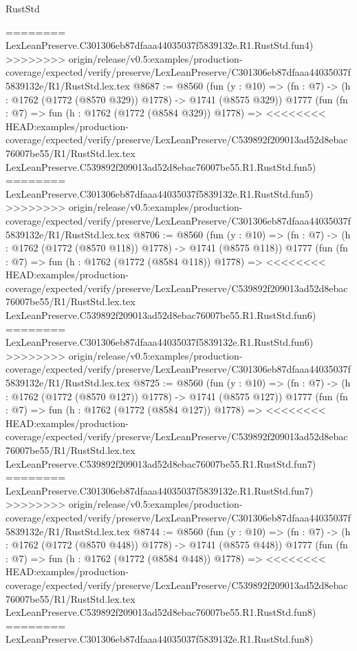 \begin{lexlean}{RustStd}
\begin{coremodule}
{\begin{coremodule}
{{{{{{{{{{{{{{{========
    LexLeanPreserve.C301306eb87dfaaa44035037f5839132e.R1.RustStd.fun4)
>>>>>>>> origin/release/v0.5:examples/production-coverage/expected/verify/preserve/LexLeanPreserve/C301306eb87dfaaa44035037f5839132e/R1/RustStd.lex.tex
@8687 := @8560
    (fun (y : @10) => (fn : @7) -> (h : @1762 (@1772 (@8570 @329)) @1778) -> @1741 (@8575 @329))
    @1777
    (fun (fn : @7) =>
    fun (h : @1762 (@1772 (@8584 @329)) @1778) =>
<<<<<<<< HEAD:examples/production-coverage/expected/verify/preserve/LexLeanPreserve/C539892f209013ad52d8ebac76007be55/R1/RustStd.lex.tex
    LexLeanPreserve.C539892f209013ad52d8ebac76007be55.R1.RustStd.fun5)
========
    LexLeanPreserve.C301306eb87dfaaa44035037f5839132e.R1.RustStd.fun5)
>>>>>>>> origin/release/v0.5:examples/production-coverage/expected/verify/preserve/LexLeanPreserve/C301306eb87dfaaa44035037f5839132e/R1/RustStd.lex.tex
@8706 := @8560
    (fun (y : @10) => (fn : @7) -> (h : @1762 (@1772 (@8570 @118)) @1778) -> @1741 (@8575 @118))
    @1777
    (fun (fn : @7) =>
    fun (h : @1762 (@1772 (@8584 @118)) @1778) =>
<<<<<<<< HEAD:examples/production-coverage/expected/verify/preserve/LexLeanPreserve/C539892f209013ad52d8ebac76007be55/R1/RustStd.lex.tex
    LexLeanPreserve.C539892f209013ad52d8ebac76007be55.R1.RustStd.fun6)
========
    LexLeanPreserve.C301306eb87dfaaa44035037f5839132e.R1.RustStd.fun6)
>>>>>>>> origin/release/v0.5:examples/production-coverage/expected/verify/preserve/LexLeanPreserve/C301306eb87dfaaa44035037f5839132e/R1/RustStd.lex.tex
@8725 := @8560
    (fun (y : @10) => (fn : @7) -> (h : @1762 (@1772 (@8570 @127)) @1778) -> @1741 (@8575 @127))
    @1777
    (fun (fn : @7) =>
    fun (h : @1762 (@1772 (@8584 @127)) @1778) =>
<<<<<<<< HEAD:examples/production-coverage/expected/verify/preserve/LexLeanPreserve/C539892f209013ad52d8ebac76007be55/R1/RustStd.lex.tex
    LexLeanPreserve.C539892f209013ad52d8ebac76007be55.R1.RustStd.fun7)
========
    LexLeanPreserve.C301306eb87dfaaa44035037f5839132e.R1.RustStd.fun7)
>>>>>>>> origin/release/v0.5:examples/production-coverage/expected/verify/preserve/LexLeanPreserve/C301306eb87dfaaa44035037f5839132e/R1/RustStd.lex.tex
@8744 := @8560
    (fun (y : @10) => (fn : @7) -> (h : @1762 (@1772 (@8570 @448)) @1778) -> @1741 (@8575 @448))
    @1777
    (fun (fn : @7) =>
    fun (h : @1762 (@1772 (@8584 @448)) @1778) =>
<<<<<<<< HEAD:examples/production-coverage/expected/verify/preserve/LexLeanPreserve/C539892f209013ad52d8ebac76007be55/R1/RustStd.lex.tex
    LexLeanPreserve.C539892f209013ad52d8ebac76007be55.R1.RustStd.fun8)
========
    LexLeanPreserve.C301306eb87dfaaa44035037f5839132e.R1.RustStd.fun8)
}}}}}}}}}}}}}}}
\end{coremodule}}
\end{coremodule}
\end{lexlean}
